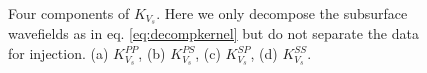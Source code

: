 \documentclass[extra,mreferee]{gji}
\begin{document}
\begin{figure}
   \centering
   \\
   \caption{Four components of $K_{V_s}$. Here we only decompose the subsurface wavefields as in
   eq. \eqref{eq:decompkernel} but do not separate the data for injection. 
   (a) $K_{V_s}^{PP}$, (b) $K_{V_s}^{PS}$, (c) $K_{V_s}^{SP}$, (d) $K_{V_s}^{SS}$.}
   \label{fig:kernel2_vs_decomp}
\end{figure}
\end{document}
